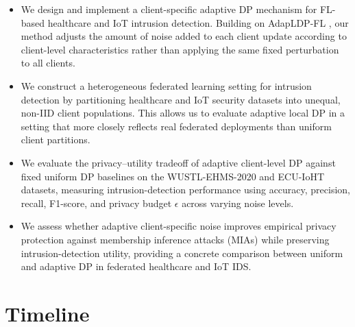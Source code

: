 \documentclass[letterpaper]{article}
\begin{document}
\begin{itemize}
    \item We design and implement a client-specific adaptive DP mechanism for FL-based healthcare and IoT intrusion detection. Building on AdapLDP-FL \cite{yue2025adapldpfl}, our method adjusts the amount of noise added to each client update according to client-level characteristics rather than applying the same fixed perturbation to all clients.
    
    \item We construct a heterogeneous federated learning setting for intrusion detection by partitioning healthcare and IoT security datasets into unequal, non-IID client populations. This allows us to evaluate adaptive local DP in a setting that more closely reflects real federated deployments than uniform client partitions.
    
    \item We evaluate the privacy--utility tradeoff of adaptive client-level DP against fixed uniform DP baselines on the WUSTL-EHMS-2020 and ECU-IoHT datasets, measuring intrusion-detection performance using accuracy, precision, recall, F1-score, and privacy budget $\epsilon$ across varying noise levels.
    
    \item We assess whether adaptive client-specific noise improves empirical privacy protection against membership inference attacks (MIAs) while preserving intrusion-detection utility, providing a concrete comparison between uniform and adaptive DP in federated healthcare and IoT IDS.
\end{itemize}

\pagebreak
\section{Timeline}

\vspace{0.5em}
\renewcommand{\arraystretch}{1.25}
\end{document}
